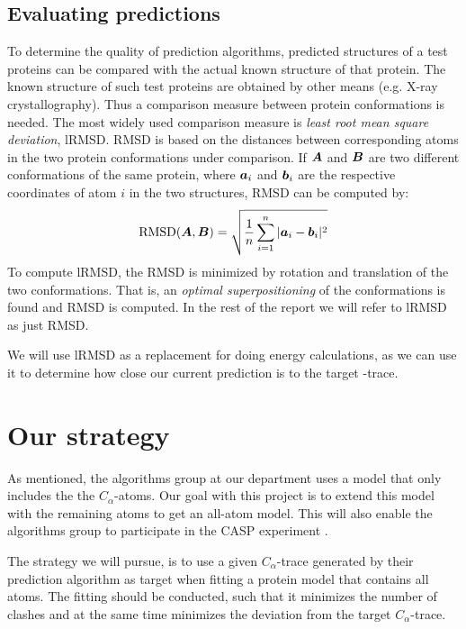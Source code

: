\subsection{Evaluating predictions}
\label{sec:eval-predictions}
To determine the quality of prediction algorithms, predicted
structures of a test proteins can be compared with the actual known
structure of that protein. The known structure of such test proteins
are obtained by other means (e.g. X-ray crystallography).  Thus a
comparison measure between protein conformations is needed. The most
widely used comparison measure is \textit{least root mean square
  deviation}, lRMSD. RMSD is based on the distances between
corresponding atoms in the two protein conformations under comparison.
If $\boldsymbol{A}$ and $\boldsymbol{B}$ are two different conformations of the same
protein, where $\boldsymbol{a}_i$ and $\boldsymbol{b}_i$ are the respective
coordinates of atom $i$ in the two structures, RMSD can be computed
by:
\begin{equation}
  \label{eq:rmsd}
  \text{RMSD}(\boldsymbol{A}, \boldsymbol{B}) = \sqrt{\frac{1}{n}\sum_{i=1}^n |\boldsymbol{a}_i - \boldsymbol{b}_i|^2}
\end{equation}
To compute lRMSD, the RMSD is minimized by rotation and
translation of the two conformations. That is, an
\textit{optimal superpositioning} of the conformations is found and
RMSD is computed. In the rest of the report we will refer to lRMSD as
just RMSD.

We will use lRMSD as a replacement for doing energy calculations, as
we can use it to determine how close our current prediction is to the
target \Ca-trace.



\section{Our strategy}
As mentioned, the algorithms group at our department uses a model that
only includes the the $C_\alpha$-atoms. Our goal with this project is
to extend this model with the remaining atoms to get an all-atom
model.  This will also enable the algorithms group to participate in
the CASP experiment \cite{caspwebsite}.

The strategy we will pursue, is to use a given $C_\alpha$-trace
generated by their prediction algorithm as target when fitting a
protein model that contains all atoms. The fitting should be conducted,
such that it minimizes the number of clashes and at the same time
minimizes the deviation from the target $C_\alpha$-trace.

